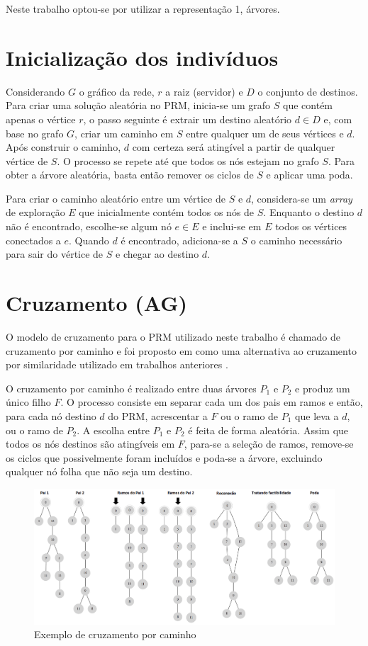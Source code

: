 Neste trabalho optou-se por utilizar a representação 1, árvores.

\section{Inicialização dos indivíduos}
Considerando $G$ o gráfico da rede, $r$ a raiz (servidor) e $D$ o conjunto de destinos. Para criar uma solução aleatória no PRM, inicia-se um grafo $S$ que contém apenas o vértice $r$, o passo seguinte é extrair um destino aleatório $d \in D$ e, com base no grafo $G$, criar um caminho em $S$ entre qualquer um de seus vértices e $d$. Após construir o caminho, $d$ com certeza será atingível a partir de qualquer vértice de $S$. O processo se repete até que todos os nós estejam no grafo $S$. Para obter a árvore aleatória, basta então remover os ciclos de $S$ e aplicar uma poda.

Para criar o caminho aleatório entre um vértice de $S$ e $d$, considera-se um \textit{array} de exploração $E$ que inicialmente contém todos os nós de $S$. Enquanto o destino $d$ não é encontrado, escolhe-se algum nó $e \in E$ e inclui-se em $E$ todos os vértices conectados a $e$. Quando $d$ é encontrado, adiciona-se a $S$ o caminho necessário para sair do vértice de $S$ e chegar ao destino $d$.

\section{Cruzamento (AG)}

O modelo de cruzamento para o PRM utilizado neste trabalho é chamado de cruzamento por caminho e foi proposto em \cite{Lafeta2016} como uma alternativa ao cruzamento por similaridade utilizado em trabalhos anteriores \cite{Bueno2010}.

O cruzamento por caminho é realizado entre duas árvores $P_1$ e $P_2$ e produz um único filho $F$. O processo consiste em separar cada um dos pais em ramos e então, para cada nó destino $d$ do PRM, acrescentar a $F$ ou o ramo de $P_1$ que leva a $d$, ou o ramo de $P_2$. A escolha entre $P_1$ e $P_2$ é feita de forma aleatória. Assim que todos os nós destinos são atingíveis em $F$, para-se a seleção de ramos, remove-se os ciclos que possivelmente foram incluídos e poda-se a árvore, excluindo qualquer nó folha que não seja um destino.

\begin{figure}[!htbp]
	\label{fig_prm-cruzamento-caminho}
	\caption{Exemplo de cruzamento por caminho}
	\centering
	\includegraphics[width=1\textwidth]{cap_estrategias-prm/figs/prm-cruzamento-caminho}
\end{figure}

